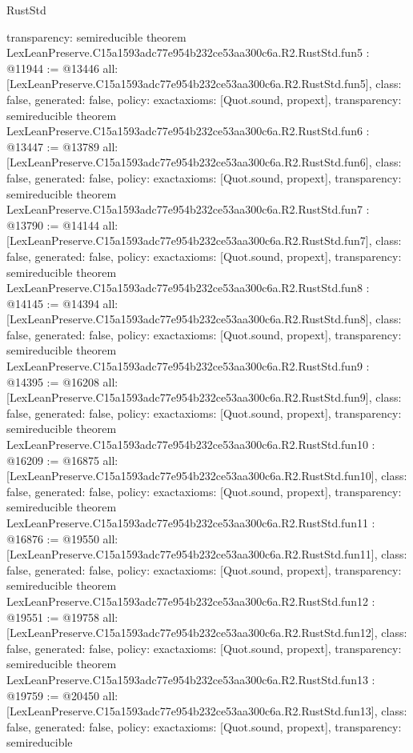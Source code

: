 \begin{lexlean}{RustStd}
\begin{coremodule}
{  transparency: semireducible
}
theorem LexLeanPreserve.C15a1593adc77e954b232ce53aa300c6a.R2.RustStd.fun5 : @11944 := @13446 {
  all: [LexLeanPreserve.C15a1593adc77e954b232ce53aa300c6a.R2.RustStd.fun5],
  class: false,
  generated: false,
  policy: exact{axioms: [Quot.sound, propext]},
  transparency: semireducible
}
theorem LexLeanPreserve.C15a1593adc77e954b232ce53aa300c6a.R2.RustStd.fun6 : @13447 := @13789 {
  all: [LexLeanPreserve.C15a1593adc77e954b232ce53aa300c6a.R2.RustStd.fun6],
  class: false,
  generated: false,
  policy: exact{axioms: [Quot.sound, propext]},
  transparency: semireducible
}
theorem LexLeanPreserve.C15a1593adc77e954b232ce53aa300c6a.R2.RustStd.fun7 : @13790 := @14144 {
  all: [LexLeanPreserve.C15a1593adc77e954b232ce53aa300c6a.R2.RustStd.fun7],
  class: false,
  generated: false,
  policy: exact{axioms: [Quot.sound, propext]},
  transparency: semireducible
}
theorem LexLeanPreserve.C15a1593adc77e954b232ce53aa300c6a.R2.RustStd.fun8 : @14145 := @14394 {
  all: [LexLeanPreserve.C15a1593adc77e954b232ce53aa300c6a.R2.RustStd.fun8],
  class: false,
  generated: false,
  policy: exact{axioms: [Quot.sound, propext]},
  transparency: semireducible
}
theorem LexLeanPreserve.C15a1593adc77e954b232ce53aa300c6a.R2.RustStd.fun9 : @14395 := @16208 {
  all: [LexLeanPreserve.C15a1593adc77e954b232ce53aa300c6a.R2.RustStd.fun9],
  class: false,
  generated: false,
  policy: exact{axioms: [Quot.sound, propext]},
  transparency: semireducible
}
theorem LexLeanPreserve.C15a1593adc77e954b232ce53aa300c6a.R2.RustStd.fun10 : @16209 := @16875 {
  all: [LexLeanPreserve.C15a1593adc77e954b232ce53aa300c6a.R2.RustStd.fun10],
  class: false,
  generated: false,
  policy: exact{axioms: [Quot.sound, propext]},
  transparency: semireducible
}
theorem LexLeanPreserve.C15a1593adc77e954b232ce53aa300c6a.R2.RustStd.fun11 : @16876 := @19550 {
  all: [LexLeanPreserve.C15a1593adc77e954b232ce53aa300c6a.R2.RustStd.fun11],
  class: false,
  generated: false,
  policy: exact{axioms: [Quot.sound, propext]},
  transparency: semireducible
}
theorem LexLeanPreserve.C15a1593adc77e954b232ce53aa300c6a.R2.RustStd.fun12 : @19551 := @19758 {
  all: [LexLeanPreserve.C15a1593adc77e954b232ce53aa300c6a.R2.RustStd.fun12],
  class: false,
  generated: false,
  policy: exact{axioms: [Quot.sound, propext]},
  transparency: semireducible
}
theorem LexLeanPreserve.C15a1593adc77e954b232ce53aa300c6a.R2.RustStd.fun13 : @19759 := @20450 {
  all: [LexLeanPreserve.C15a1593adc77e954b232ce53aa300c6a.R2.RustStd.fun13],
  class: false,
  generated: false,
  policy: exact{axioms: [Quot.sound, propext]},
  transparency: semireducible
}
\end{coremodule}
\end{lexlean}
